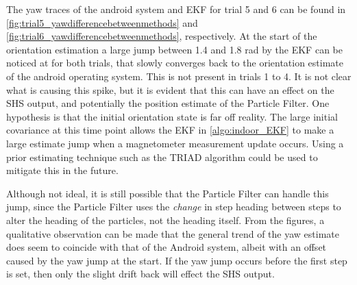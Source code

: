 The yaw traces of the android system and EKF for trial 5 and 6 can be found in \cref{fig:trial5_yawdifferencebetweenmethods} and \cref{fig:trial6_yawdifferencebetweenmethods}, respectively. At the start of the orientation estimation a large jump between 1.4 and 1.8 rad by the EKF can be noticed at for both trials, that slowly converges back to the orientation estimate of the android operating system. This is not present in trials 1 to 4. It is not clear what is causing this spike, but it is evident that this can have an effect on the SHS output, and potentially the position estimate of the Particle Filter. One hypothesis is that the initial orientation state is far off reality. The large initial covariance at this time point allows the EKF in \cref{algo:indoor_EKF} to make a large estimate jump when a magnetometer measurement update occurs. Using a prior estimating technique such as the TRIAD algorithm \cite{Kok2017} could be used to mitigate this in the future. \par 

Although not ideal, it is still possible that the Particle Filter can handle this jump, since the Particle Filter uses the \textit{change} in step heading between steps to alter the heading of the particles, not the heading itself. From the figures, a qualitative observation can be made that the general trend of the yaw estimate does seem to coincide with that of the Android system, albeit with an offset caused by the yaw jump at the start. If the yaw jump occurs before the first step is set, then only the slight drift back will effect the \ac{SHS} output. \par 

